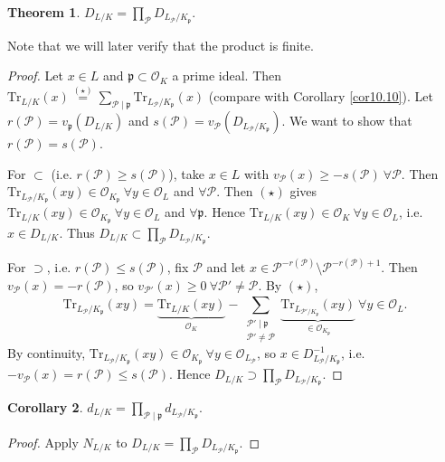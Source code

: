 \documentclass{article}
\theoremstyle{definition}
\newtheorem{theorem}{Theorem}[section]
\newtheorem{cor}[theorem]{Corollary}
\begin{document}
\begin{theorem}
    $D_{L/K} = \prod_{\mathcal{P}}^{} D_{L_\mathcal{P}/K_\mathfrak{p}}$. 
\end{theorem}
Note that we will later verify that the product is finite.
\begin{proof}
    Let $x \in L$ and $\mathfrak{p} \subset \mathcal{O}_K$ a prime ideal. Then $\text{Tr}_{L/K}(x) \stackrel{(\star)}{=} \sum_{\mathcal{P}\mid  \mathfrak{p}}^{} \text{Tr}_{L_\mathcal{P}/K_\mathfrak{p}}(x)$ (compare with Corollary \ref{cor10.10}). Let $r(\mathcal{P}) = v_{\mathfrak{p}}(D_{L/K})$ and $s(\mathcal{P}) = v_{\mathcal{P}}(D_{L_\mathcal{P}/K_\mathfrak{p}})$. We want to show that $r(\mathcal{P}) = s(\mathcal{P})$. 
    \vspace{1mm}
     
    For $\subset$ (i.e. $r(\mathcal{P})\ge s(\mathcal{P})$), take $x \in L$ with $v_{\mathcal{P}}(x) \ge -s(\mathcal{P}) ~\forall \mathcal{P}$. Then $\text{Tr}_{L_\mathcal{P}/K_\mathfrak{p}}(xy) \in \mathcal{O}_{K_\mathfrak{p}} ~\forall y \in \mathcal{O}_L$ and $\forall \mathcal{P}$. Then $(\star)$ gives $\text{Tr}_{L/K}(xy) \in \mathcal{O}_{K_\mathfrak{p}} ~\forall y \in \mathcal{O}_L$ and $\forall \mathfrak{p}$. Hence $\text{Tr}_{L/K}(xy) \in \mathcal{O}_K ~\forall y \in \mathcal{O}_L$, i.e. $x \in D_{L/K}$. Thus $D_{L/K} \subset \prod_{\mathcal{P}}^{} D_{L_\mathcal{P}/K_\mathfrak{p}}$.
    \vspace{1mm}
     
    For $\supset$, i.e. $r(\mathcal{P})\le s(\mathcal{P})$, fix $\mathcal{P}$ and let $x \in \mathcal{P}^{-r(\mathcal{P})}\setminus \mathcal{P}^{-r(\mathcal{P})+1}$. Then $v_{\mathcal{P}}(x) = -r(\mathcal{P})$, so $v_{\mathcal{P}'}(x) \ge 0 ~\forall \mathcal{P}' \neq \mathcal{P}$. By $(\star)$, $$\text{Tr}_{L_\mathcal{P}/K_{\mathfrak{p}}}(xy) = \underbrace{\text{Tr}_{L/K}(xy)}_{\mathcal{O}_K} - \sum_{\substack{\mathcal{P}' \mid \mathfrak{p}\\\mathcal{P}'\neq\mathcal{P}}}^{} \underbrace{\text{Tr}_{L_{\mathcal{P}'/K_\mathfrak{p}}}(xy)}_{\in \mathcal{O}_{K_\mathfrak{p}}} ~\forall y \in \mathcal{O}_L.$$
    By continuity, $\text{Tr}_{L_\mathcal{P}/K_\mathfrak{p}}(xy) \in \mathcal{O}_{K_\mathfrak{p}} ~\forall y \in \mathcal{O}_{L_\mathcal{P}}$, so $x \in D^{-1}_{L_\mathcal{P}/K_\mathfrak{p}}$, i.e. $-v_{\mathcal{P}}(x) = r(\mathcal{P}) \le s(\mathcal{P})$. Hence $D_{L/K} \supset \prod_{\mathcal{P}}^{} D_{L_\mathcal{P}/K_\mathfrak{p}}$. 
\end{proof}
\begin{cor}
    $d_{L/K} = \prod_{\mathcal{P}\mid \mathfrak{p}}^{} d_{L_\mathcal{P}/K_\mathfrak{p}}$.
\end{cor}
\begin{proof}
    Apply $N_{L/K}$ to $D_{L/K} = \prod_{\mathcal{P}}^{} D_{L_\mathcal{P}/K_{\mathfrak{p}}}$.
\end{proof}
\end{document}
